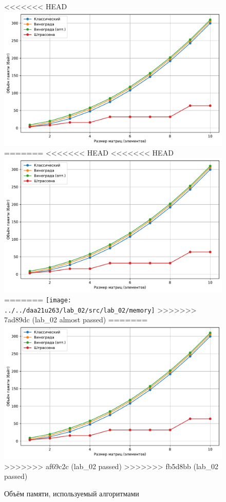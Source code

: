 \begin{figure}
	\centering
<<<<<<< HEAD
	\includegraphics[width=0.9\linewidth]{../src/lab_02/memory}
=======
<<<<<<< HEAD
<<<<<<< HEAD
	\includegraphics[width=0.9\linewidth]{../src/lab_02/memory}
=======
	\texttt{[image: ../../daa21u263/lab\_02/src/lab\_02/memory]}
>>>>>>> 7ad89dc (lab_02 almost passed)
=======
	\includegraphics[width=0.9\linewidth]{../src/lab_02/memory}
>>>>>>> af69c2c (lab_02 passed)
>>>>>>> fb5d8bb (lab_02 passed)
	\caption{Объём памяти, используемый алгоритмами}
	\label{fig:memory}
\end{figure}


